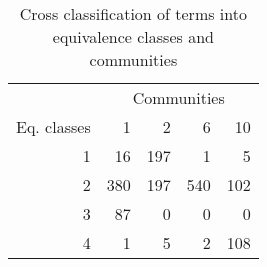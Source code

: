 \begin{table}[ht]
\centering
\begin{tabular}{rrrrr}
  \hline
  & \multicolumn{4}{c}{ Communities } \\
 Eq. classes & 1 & 2 & 6 & 10 \\
 \hline
1 &  16 & 197 &   1 &   5 \\ 
  2 & 380 & 197 & 540 & 102 \\ 
  3 &  87 &   0 &   0 &   0 \\ 
  4 &   1 &   5 &   2 & 108 \\ 
   \hline
\end{tabular}
\caption[Cross-tabulation of equivalence classes and communities]{Cross classification of terms into equivalence classes and communities} 
\label{tab:c3_global_blocks}
\end{table}
